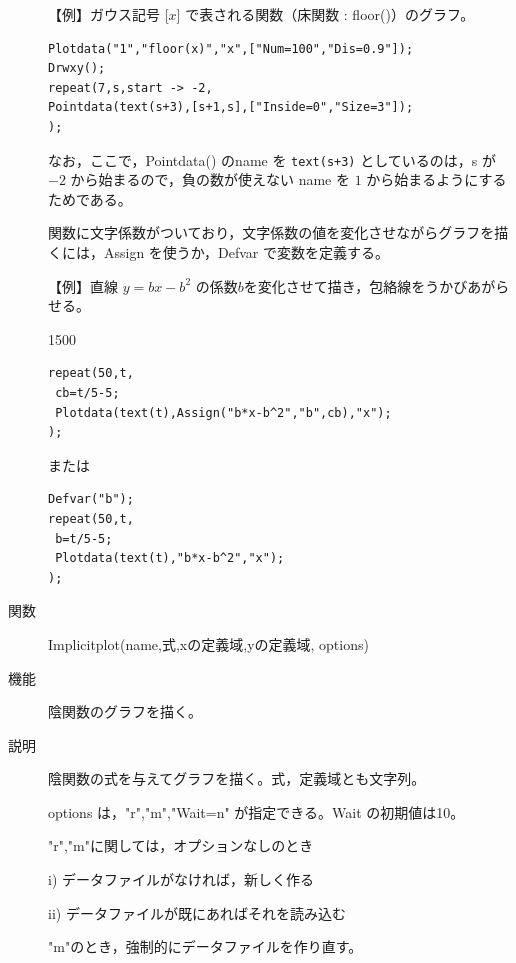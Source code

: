 \documentclass[papersize,a4paper,12pt,uplatex]{jsarticle}
\begin{document}
\begin{description}
\vspace{\baselineskip}
【例】ガウス記号 [$x$] で表される関数（床関数 : floor()）のグラフ。
\begin{verbatim}
Plotdata("1","floor(x)","x",["Num=100","Dis=0.9"]);
Drwxy();
repeat(7,s,start -> -2,
Pointdata(text(s+3),[s+1,s],["Inside=0","Size=3"]);
);
\end{verbatim}

\hspace{45mm} 

なお，ここで，Pointdata() のname を \verb|text(s+3)| としているのは，s が $-2$ から始まるので，負の数が使えない name を $1$ から始まるようにするためである。

\vspace{\baselineskip}
関数に文字係数がついており，文字係数の値を変化させながらグラフを描くには，Assign を使うか，Defvar で変数を定義する。

\vspace{\baselineskip}
【例】直線 $y=bx-b^2$ の係数$b$を変化させて描き，包絡線をうかびあがらせる。

\begin{layer}{150}{0}
\end{layer}
\begin{verbatim}
repeat(50,t,
 cb=t/5-5;
 Plotdata(text(t),Assign("b*x-b^2","b",cb),"x");
);
\end{verbatim}

または
\begin{verbatim}
Defvar("b");
repeat(50,t,
 b=t/5-5;
 Plotdata(text(t),"b*x-b^2","x");
);
\end{verbatim}

\hypertarget{implicitplot}{}
\item[関数]Implicitplot(name,式,xの定義域,yの定義域, options)
\item[機能]陰関数のグラフを描く。
\item[説明]陰関数の式を与えてグラフを描く。式，定義域とも文字列。

options は，"r","m","Wait=n" が指定できる。Wait の初期値は10。

"r","m"に関しては，オプションなしのとき

i) データファイルがなければ，新しく作る

ii) データファイルが既にあればそれを読み込む

"m"のとき，強制的にデータファイルを作り直す。


\end{description}
\end{document}
